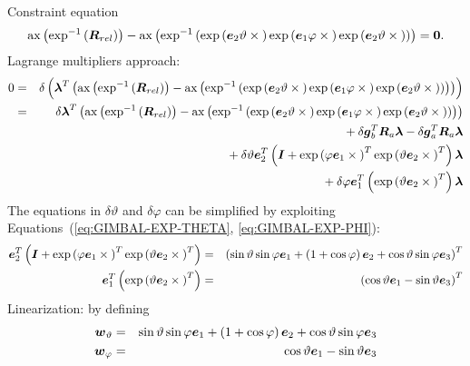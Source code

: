 \documentclass[10pt,dvips]{report}
\newcommand{\T}[1]{\boldsymbol{#1}}
\begin{document}
\noindent
Constraint equation
\begin{equation}
	\llk{ax}\plbr{\llk{exp}^{-1}\plbr{\T{R}_{rel}}}
	- \llk{ax}\plbr{\llk{exp}^{-1}\plbr{
		\llk{exp}\plbr{\T{e}_2 \vartheta \times{}}
		\llk{exp}\plbr{\T{e}_1 \varphi \times{}}
		\llk{exp}\plbr{\T{e}_2 \vartheta \times{}}
	}} = \T{0}.
	\label{eq:GIMBAL-CONSTRAINT}
\end{equation}
Lagrange multipliers approach:
\begin{eqnarray*}
	0 & = & \delta\plbr{\T{\lambda}^T\plbr{
	\llk{ax}\plbr{\llk{exp}^{-1}\plbr{\T{R}_{rel}}}
	- \llk{ax}\plbr{\llk{exp}^{-1}\plbr{
		\llk{exp}\plbr{\T{e}_2 \vartheta \times{}}
		\llk{exp}\plbr{\T{e}_1 \varphi \times{}}
		\llk{exp}\plbr{\T{e}_2 \vartheta \times{}}
	}}
	}} \\
	& = & \delta\T{\lambda}^T \plbr{
	\llk{ax}\plbr{\llk{exp}^{-1}\plbr{\T{R}_{rel}}}
	- \llk{ax}\plbr{\llk{exp}^{-1}\plbr{
		\llk{exp}\plbr{\T{e}_2 \vartheta \times{}}
		\llk{exp}\plbr{\T{e}_1 \varphi \times{}}
		\llk{exp}\plbr{\T{e}_2 \vartheta \times{}}
	}}
	} \\
	& & \mbox{} + \delta\T{g}_b^T \T{R}_a \T{\lambda}
	- \delta\T{g}_a^T \T{R}_a \T{\lambda} \\
	& & \mbox{} + \delta\vartheta \T{e}_2^T \plbr{
		\T{I} + \llk{exp}\plbr{\varphi \T{e}_1 \times{}}^T
			\llk{exp}\plbr{\vartheta \T{e}_2 \times{}}^T
	} \T{\lambda} \\
	& & \mbox{} + \delta\varphi \T{e}_1^T \plbr{
		\llk{exp}\plbr{\vartheta \T{e}_2 \times{}}^T
	} \T{\lambda}
\end{eqnarray*}
The equations in $\delta\vartheta $ and $\delta\varphi$ can be simplified
by exploiting Equations~(\ref{eq:GIMBAL-EXP-THETA}, \ref{eq:GIMBAL-EXP-PHI}):
\begin{eqnarray*}
	\T{e}_2^T \plbr{
		\T{I} + \llk{exp}\plbr{\varphi \T{e}_1 \times{}}^T
			\llk{exp}\plbr{\vartheta \T{e}_2 \times{}}^T
	} & = & \plbr{
		\sin\vartheta \sin\varphi \T{e}_1
		+ \plbr{1 + \cos\varphi} \T{e}_2 
		+ \cos\vartheta\sin\varphi \T{e}_3
	}^T \\
	\T{e}_1^T \plbr{
		\llk{exp}\plbr{\vartheta \T{e}_2 \times{}}^T
	} & = & \plbr{
		\cos\vartheta \T{e}_1 - \sin\vartheta \T{e}_3
	}^T 
\end{eqnarray*}
Linearization: by defining
\begin{eqnarray*}
	\T{w}_{\vartheta} & = & 
		\sin\vartheta \sin\varphi \T{e}_1
		+ \plbr{1 + \cos\varphi} \T{e}_2 
		+ \cos\vartheta\sin\varphi \T{e}_3 \\
	\T{w}_{\varphi} & = & 
		\cos\vartheta \T{e}_1 - \sin\vartheta \T{e}_3
\end{eqnarray*}
\end{document}
